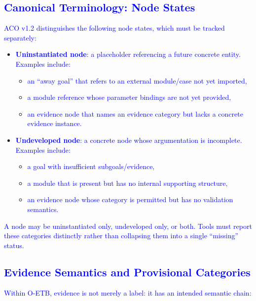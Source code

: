 \documentclass[11pt]{article}
\begin{document}
\subsection{\textcolor{blue}{Canonical Terminology: Node States}}

\textcolor{blue}{ACO v1.2 distinguishes the following node states, which must be tracked separately:}

\begin{itemize}[leftmargin=2em]
  \item \textcolor{blue}{\textbf{Uninstantiated node}: a placeholder referencing a future concrete entity. Examples include:}
  \begin{itemize}[leftmargin=1.5em]
    \item \textcolor{blue}{an ``away goal'' that refers to an external module/case not yet imported,}
    \item \textcolor{blue}{a module reference whose parameter bindings are not yet provided,}
    \item \textcolor{blue}{an evidence node that names an evidence category but lacks a concrete evidence instance.}
  \end{itemize}

  \item \textcolor{blue}{\textbf{Undeveloped node}: a concrete node whose argumentation is incomplete. Examples include:}
  \begin{itemize}[leftmargin=1.5em]
    \item \textcolor{blue}{a goal with insufficient subgoals/evidence,}
    \item \textcolor{blue}{a module that is present but has no internal supporting structure,}
    \item \textcolor{blue}{an evidence node whose category is permitted but has no validation semantics.}
  \end{itemize}
\end{itemize}

\textcolor{blue}{A node may be uninstantiated only, undeveloped only, or both. Tools must report these categories distinctly rather than collapsing them into a single ``missing'' status.}

\subsection{\textcolor{blue}{Evidence Semantics and Provisional Categories}}

\textcolor{blue}{Within O-ETB, evidence is not merely a label: it has an intended semantic chain:}
\end{document}
